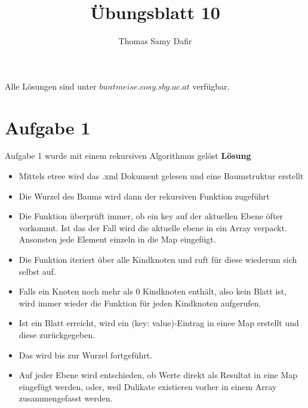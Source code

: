 \documentclass[12pt, a4paper]{report}
\title{Übungsblatt 10}
\author{Thomas Samy Dafir}
\date{}
\begin{document}
\maketitle

Alle Lösungen sind unter $buntmeise.cosy.sbg.ac.at$ verfügbar.

\section*{Aufgabe 1}
Aufgabe 1 wurde mit einem rekursiven Algorithmus gelöst
\textbf{Lösung}
	\begin{itemize}
		\item Mittels etree wird das .xml Dokument gelesen und eine Baumstruktur erstellt
		\item Die Wurzel des Baums wird dann der rekursiven Funktion zugeführt
		\item Die Funktion überprüft immer, ob ein key auf der aktuellen Ebene öfter vorkommt. Ist das der Fall
		wird die aktuelle ebene in ein Array verpackt. Ansonsten jede Element einzeln in die Map eingefügt.
		\item Die Funktion iteriert über alle Kindknoten und ruft für diese wiederum sich selbst auf.
		\item Falls ein Knoten noch mehr als 0 Kindknoten enthält, also kein Blatt ist, wird immer wieder
		die Funktion für jeden Kindknoten aufgerufen.
		\item Ist ein Blatt erreicht, wird ein (key: value)-Eintrag in einee Map erstellt und diese zurückgegeben.
		\item Das wird bis zur Wurzel fortgeführt.
		\item Auf jeder Ebene wird entschieden, ob Werte direkt als Resultat in eine Map eingefügt werden, oder, weil
		Dulikate existieren vorher in einem Array zusammengefasst werden. 
	\end{itemize}
\end{document}
